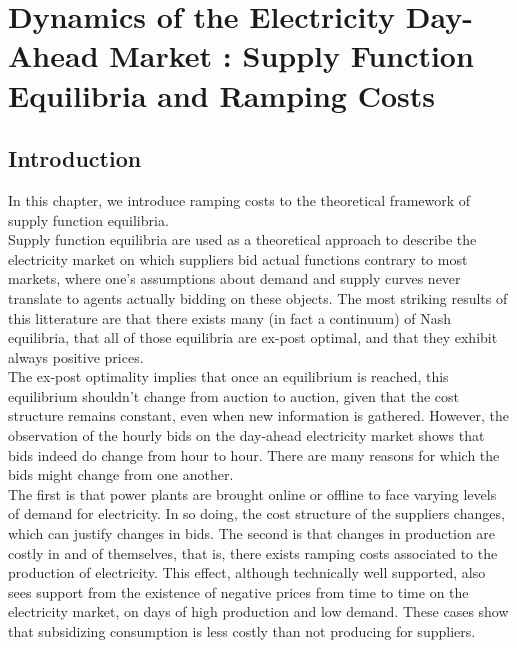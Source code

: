 


\renewcommand{\thesection}{\arabic{chapter}.\arabic{section}}



\chapter{Dynamics of the Electricity Day-Ahead Market : Supply Function Equilibria and Ramping Costs}
\label{chap:ch1}
\cleardoublepage

\doublespacing
\section{Introduction}
In this chapter, we introduce ramping costs to the theoretical framework of supply function equilibria. \\

Supply function equilibria are used as a theoretical approach to describe the electricity market on which suppliers bid actual functions contrary to most markets, where one's assumptions about demand and supply curves never translate to agents actually bidding on these objects. The most striking results of this litterature are that there exists many (in fact a continuum) of Nash equilibria, that all of those equilibria are ex-post optimal, and that they exhibit always positive prices. \\

The ex-post optimality implies that once an equilibrium is reached, this equilibrium shouldn't change from auction to auction, given that the cost structure remains constant, even when new information is gathered. However, the observation of the hourly bids on the day-ahead electricity market shows that bids indeed do change from hour to hour. There are many reasons for which the bids might change from one another. \\

The first is that power plants are brought online or offline to face varying levels of demand for electricity. In so doing, the cost structure of the suppliers changes, which can justify changes in bids. The second is that changes in production are costly in and of themselves, that is, there exists ramping costs associated to the production of electricity. This effect, although technically well supported, also sees support from the existence of negative prices from time to time on the electricity market, on days of high production and low demand. These cases show that subsidizing consumption is less costly than not producing for suppliers. \\

